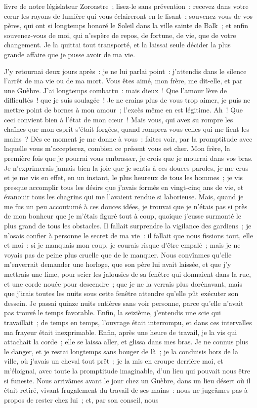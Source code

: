 \documentclass[french,twoside]{book} %
\begin{document}
livre de notre législateur Zoroastre ; lisez-le sans prévention : recevez dans votre cœur les rayons de lumière qui vous éclaireront en le lisant ; souvenez-vous de vos pères, qui ont si longtemps honoré le Soleil dans la ville sainte de Balk ; et enfin souvenez-vous de moi, qui n’espère de repos, de fortune, de vie, que de votre changement. Je la quittai tout transporté, et la laissai seule décider la plus grande affaire que je pusse avoir de ma vie.\par
J’y retournai deux jours après : je ne lui parlai point : j’attendis dans le silence l’arrêt de ma vie ou de ma mort. Vous êtes aimé, mon frère, me dit-elle, et par une Guèbre. J’ai longtemps combattu : mais dieux ! Que l’amour lève de difficultés ! que je suis soulagée ! Je ne crains plus de vous trop aimer, je puis ne mettre point de bornes à mon amour ; l’excès même en est légitime. Ah ! Que ceci convient bien à l’état de mon cœur ! Mais vous, qui avez su rompre les chaînes que mon esprit s’était forgées, quand romprez-vous celles qui me lient les mains ? Dès ce moment je me donne à vous : faites voir, par la promptitude avec laquelle vous m’accepterez, combien ce présent vous est cher. Mon frère, la première fois que je pourrai vous embrasser, je crois que je mourrai dans vos bras. Je n’exprimerais jamais bien la joie que je sentis à ces douces paroles, je me crus et je me vis en effet, en un instant, le plus heureux de tous les hommes ; je vis presque accomplir tous les désirs que j’avais formés en vingt-cinq ans de vie, et évanouir tous les chagrins qui me l’avaient rendue si laborieuse. Mais, quand je me fus un peu accoutumé à ces douces idées, je trouvai que je n’étais pas si près de mon bonheur que je m’étais figuré tout à coup, quoique j’eusse surmonté le plus grand de tous les obstacles. Il fallait surprendre la vigilance des gardiens ; je n’osais confier à personne le secret de ma vie : il fallait que nous fissions tout, elle et moi : si je manquais mon coup, je courais risque d’être empalé ; mais je ne voyais pas de peine plus cruelle que de le manquer. Nous convînmes qu’elle m’enverrait demander une horloge, que son père lui avait laissée, et que j’y mettrais une lime, pour scier les jalousies de sa fenêtre qui donnaient dans la rue, et une corde nouée pour descendre ; que je ne la verrais plus dorénavant, mais que j’irais toutes les nuits sous cette fenêtre attendre qu’elle pût exécuter son dessein. Je passai quinze nuits entières sans voir personne, parce qu’elle n’avait pas trouvé le temps favorable. Enfin, la seizième, j’entendis une scie qui travaillait ; de temps en temps, l’ouvrage était interrompu, et dans ces intervalles ma frayeur était inexprimable. Enfin, après une heure de travail, je la vis qui attachait la corde ; elle se laissa aller, et glissa dans mes bras. Je ne connus plus le danger, et je restai longtemps sans bouger de là ; je la conduisis hors de la ville, où j’avais un cheval tout prêt ; je la mis en croupe derrière moi, et m’éloignai, avec toute la promptitude imaginable, d’un lieu qui pouvait nous être si funeste. Nous arrivâmes avant le jour chez un Guèbre, dans un lieu désert où il était retiré, vivant frugalement du travail de ses mains : nous ne jugeâmes pas à propos de rester chez lui ; et, par son conseil, nous 
\end{document}
